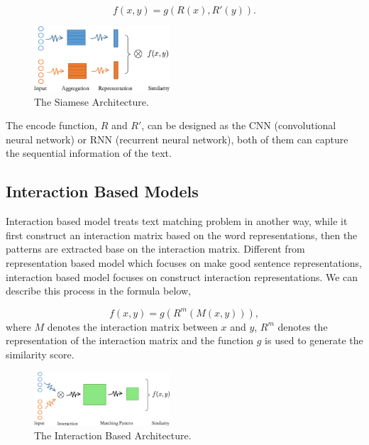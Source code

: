 \documentclass[12pt]{article}
\begin{document}
\begin{equation}
	f(x,y) = g(R(x), R'(y)).
\end{equation}

\begin{figure}[ht]
  \centering
  \includegraphics[width=0.45\textwidth]{../img/siamese}
  \caption{The Siamese Architecture.} \label{Fig.siamese}
\end{figure}

The encode function, $R$ and $R'$, can be designed as the CNN (convolutional neural network) or RNN (recurrent neural network), both of them can capture the sequential information of the text. 


\subsection{Interaction Based Models}

Interaction based model treats text matching problem in another way, while it first construct an interaction matrix based on the word representations, then the patterns are extracted base on the interaction matrix. Different from representation based model which focuses on make good sentence representations, interaction based model focuses on construct interaction representations. We can describe this process in the formula below,

\begin{equation}
	f(x, y) = g(R^m(M(x,y))),
\end{equation}
where $M$ denotes the interaction matrix between $x$ and $y$, $R^m$ denotes the representation of the interaction matrix and the function $g$ is used to generate the similarity score.

\begin{figure}[ht]
  \centering
  \includegraphics[width=0.45\textwidth]{../img/match_ptn}
  \caption{The Interaction Based Architecture.} \label{Fig.interaction}
\end{figure}
\end{document}
